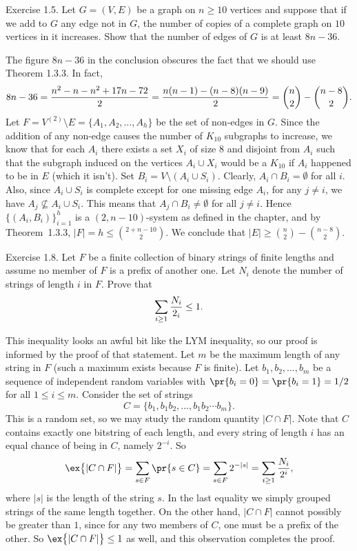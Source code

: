 \proclaim \llap{*}Exercise 1.5. Let $G=(V,E)$ be a graph on $n\ge 10$ vertices and suppose that if we add
to $G$ any edge not in $G$, the number of copies of a complete graph on $10$ vertices in it increases.
Show that the number of edges of $G$ is at least $8n-36$.

\proof The figure $8n-36$ in the conclusion obscures the fact that we should use Theorem 1.3.3. In
fact,
$$8n-36 = {n^2-n-n^2+17n-72\over 2} = {n(n-1) - (n-8)(n-9)\over 2} = {n\choose 2}-{n-8\choose 2}.$$
Let $F = V^{(2)}\setminus E = \{A_1, A_2,\ldots, A_h\}$ be the set of non-edges in $G$. Since the addition
of any non-edge causes the number of $K_{10}$ subgraphs to increase, we know that for each $A_i$ there
exists a set $X_i$ of size $8$ and disjoint from $A_i$ such that the subgraph induced on
the vertices $A_i\cup X_i$ would be a $K_{10}$ if $A_i$ happened to be in $E$ (which it isn't).
Set $B_i = V\setminus (A_i\cup S_i)$. Clearly, $A_i\cap B_i = \emptyset$ for all $i$. Also,
since $A_i\cup S_i$ is complete except for one missing edge $A_i$, for any $j\ne i$, we have
$A_j\not\subseteq A_i\cup S_i$. This means that $A_j\cap B_i\neq\emptyset$ for all $j\ne i$. Hence
$\bigl\{(A_i,B_i)\bigr\}_{i=1}^h$ is a $(2,n-10)$-system as defined in the chapter, and by
Theorem~1.3.3, $|F| = h\le {2+n-10\choose 2}$. We conclude that $|E|\ge {n\choose 2}-{n-8\choose 2}$.\slug

\proclaim Exercise 1.8. Let $F$ be a finite collection of binary strings of finite lengths and assume no
member of $F$ is a prefix of another one. Let $N_i$ denote the number of strings of length $i$ in $F$.
Prove that
$$\sum_{i\ge 1} {N_i\over 2_i} \le 1.$$

\proof This inequality looks an awful bit like the LYM inequality, so our proof is informed by the proof
of that statement. Let $m$ be the maximum length of any string in $F$ (such a maximum exists because $F$
is finite). Let $b_1, b_2, \ldots, b_m$ be a sequence of independent random variables with
$\pr\{b_i = 0\} = \pr\{b_i = 1\} = 1/2$ for all $1\le i\le m$. Consider the set of strings
$$C = \{b_1, b_1b_2, \ldots, b_1b_2\cdots b_m\}.$$
This is a random set, so we may study the random quantity $|C\cap F|$. Note that $C$ contains
exactly one bitstring of each length, and every string of length $i$ has an equal chance of being in $C$,
namely $2^{-i}$. So
$$\ex\bigl\{|C\cap F|\bigr\} = \sum_{s\in F} \pr\{s\in C\} = \sum_{s\in F} 2^{-|s|}
= \sum_{i\ge 1} {N_i\over 2^i},$$
where $|s|$ is the length of the string $s$. In the last equality we simply grouped strings of the same
length together. On the other hand, $|C\cap F|$ cannot possibly be greater than $1$, since for any two
members of $C$, one must be a prefix of the other. So $\ex\bigl\{|C\cap F|\bigr\} \le 1$ as well,
and this observation completes the proof.\slug

